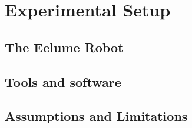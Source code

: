\chapter{Experimental Setup}

\section{The Eelume Robot}
\section{Tools and software}
\section{Assumptions and Limitations}
